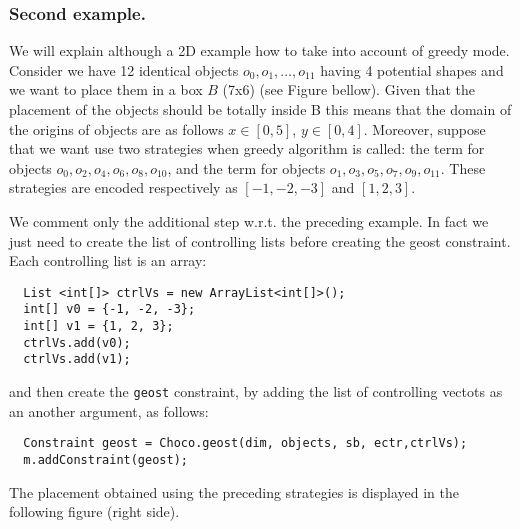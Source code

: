 \subsubsection{Second example.}\label{geostdescription:secondexample}\hypertarget{geostdescription:secondexample}{}
We will explain although a 2D example how to take into account of greedy mode. Consider we have 12 identical objects $o_0,o_1,\ldots,o_{11}$ having 4 potential shapes and we want to place them in a box $B$ (7x6) (see Figure bellow). Given that the placement of the objects should be totally inside B this means that the domain of the origins of objects are as follows $x\in [0,5]$, $y\in [0,4]$. Moreover, suppose that we want use two strategies when greedy algorithm is called: the term  for objects $o_0, o_2, o_4, o_6, o_8, o_{10}$, and the term  for objects $o_1, o_3, o_5, o_7, o_9, o_{11}$. These strategies are encoded respectively as $[-1,-2,-3]$ and $[1, 2, 3]$.


We comment only the additional step w.r.t. the preceding example. In fact we just need to create the list of controlling lists before creating the geost constraint. Each controlling list is an array:
\begin{lstlisting}
  List <int[]> ctrlVs = new ArrayList<int[]>();
  int[] v0 = {-1, -2, -3};
  int[] v1 = {1, 2, 3};
  ctrlVs.add(v0);
  ctrlVs.add(v1);
\end{lstlisting}
and then create the \texttt{geost} constraint, by adding the list of controlling vectots as an another argument, as follows:
\begin{lstlisting}
  Constraint geost = Choco.geost(dim, objects, sb, ectr,ctrlVs);
  m.addConstraint(geost);
\end{lstlisting}

%


The placement obtained using the preceding strategies is displayed in the following figure (right side).


